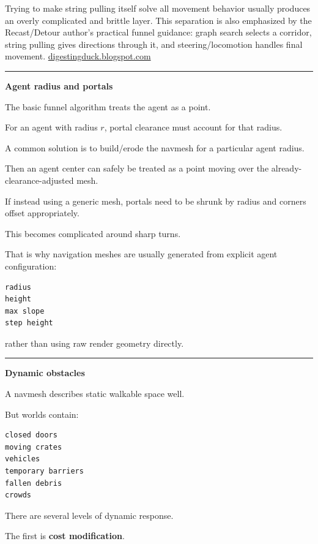 Trying to make string pulling itself solve all movement behavior usually produces an overly complicated and brittle layer. This separation is also emphasized by the Recast/Detour author's practical funnel guidance: graph search selects a corridor, string pulling gives directions through it, and steering/locomotion handles final movement. \href{https://digestingduck.blogspot.com/2010/03/simple-stupid-funnel-algorithm.html?utm_source=chatgpt.com}{digestingduck.blogspot.com}

\begin{center}\rule{0.5\linewidth}{0.5pt}\end{center}

\textbf{Agent radius and portals}

The basic funnel algorithm treats the agent as a point.

For an agent with radius \(r\), portal clearance must account for that radius.

A common solution is to build/erode the navmesh for a particular agent radius.

Then an agent center can safely be treated as a point moving over the already-clearance-adjusted mesh.

If instead using a generic mesh, portals need to be shrunk by radius and corners offset appropriately.

This becomes complicated around sharp turns.

That is why navigation meshes are usually generated from explicit agent configuration:

\begin{verbatim}
radius
height
max slope
step height
\end{verbatim}

rather than using raw render geometry directly.

\begin{center}\rule{0.5\linewidth}{0.5pt}\end{center}

\textbf{Dynamic obstacles}

A navmesh describes static walkable space well.

But worlds contain:

\begin{verbatim}
closed doors
moving crates
vehicles
temporary barriers
fallen debris
crowds
\end{verbatim}

There are several levels of dynamic response.

The first is \textbf{cost modification}.

